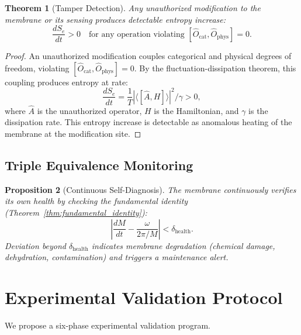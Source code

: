 \documentclass[twocolumn,10pt]{article}
\newtheorem{theorem}{Theorem}[section]
\newtheorem{proposition}[theorem]{Proposition}
\theoremstyle{definition}
\theoremstyle{remark}
\newcommand{\Se}{S_e}
\newcommand{\Ocat}{\hat{O}_{\mathrm{cat}}}
\newcommand{\Ophys}{\hat{O}_{\mathrm{phys}}}
\begin{document}
\begin{theorem}[Tamper Detection]
\label{thm:tamper}
Any unauthorized modification to the membrane or its sensing produces detectable entropy increase:
\begin{equation}
  \frac{d\Se}{dt} > 0 \quad \text{for any operation violating } [\Ocat, \Ophys] = 0.
  \label{eq:tamper}
\end{equation}
\end{theorem}

\begin{proof}
An unauthorized modification couples categorical and physical degrees of freedom, violating $[\Ocat, \Ophys] = 0$. By the fluctuation-dissipation theorem, this coupling produces entropy at rate:
\begin{equation}
  \frac{d\Se}{dt} = \frac{1}{T}|\langle[\hat{A}, H]\rangle|^2 / \gamma > 0,
  \label{eq:tamper_proof}
\end{equation}
where $\hat{A}$ is the unauthorized operator, $H$ is the Hamiltonian, and $\gamma$ is the dissipation rate. This entropy increase is detectable as anomalous heating of the membrane at the modification site.
\end{proof}

\subsection{Triple Equivalence Monitoring}

\begin{proposition}[Continuous Self-Diagnosis]
\label{prop:self_diagnosis}
The membrane continuously verifies its own health by checking the fundamental identity (Theorem~\ref{thm:fundamental_identity}):
\begin{equation}
  \left|\frac{dM}{dt} - \frac{\omega}{2\pi/M}\right| < \delta_{\mathrm{health}}.
  \label{eq:self_diagnosis}
\end{equation}
Deviation beyond $\delta_{\mathrm{health}}$ indicates membrane degradation (chemical damage, dehydration, contamination) and triggers a maintenance alert.
\end{proposition}


\section{Experimental Validation Protocol}
\label{sec:validation}

We propose a six-phase experimental validation program.
\end{document}
